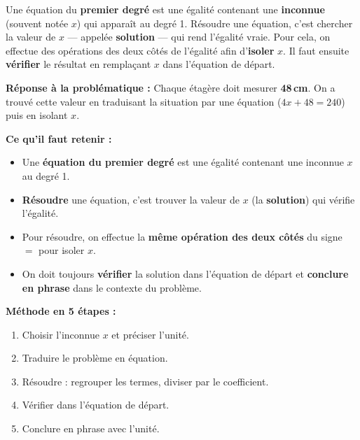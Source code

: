 \documentclass[a4paper,11pt]{article}
\begin{document}
\begin{correction}
\og Une équation du \textbf{premier degré} est une égalité contenant une \textbf{inconnue} (souvent notée $x$) qui apparaît au degré 1. Résoudre une équation, c'est chercher la valeur de $x$ — appelée \textbf{solution} — qui rend l'égalité vraie. Pour cela, on effectue des opérations des deux côtés de l'égalité afin d'\textbf{isoler} $x$. Il faut ensuite \textbf{vérifier} le résultat en remplaçant $x$ dans l'équation de départ. \fg
\end{correction}

\vspace{10pt}

\begin{retenir}
\textbf{Réponse à la problématique :} Chaque étagère doit mesurer \textbf{48\,cm}. On a trouvé cette valeur en traduisant la situation par une équation ($4x + 48 = 240$) puis en isolant $x$.

\bigskip
\textbf{Ce qu'il faut retenir :}
\begin{itemize}[leftmargin=14pt]
  \item Une \textbf{équation du premier degré} est une égalité contenant une inconnue $x$ au degré 1.
  \item \textbf{Résoudre} une équation, c'est trouver la valeur de $x$ (la \textbf{solution}) qui vérifie l'égalité.
  \item Pour résoudre, on effectue la \textbf{même opération des deux côtés} du signe $=$ pour isoler $x$.
  \item On doit toujours \textbf{vérifier} la solution dans l'équation de départ et \textbf{conclure en phrase} dans le contexte du problème.
\end{itemize}

\bigskip
\textbf{Méthode en 5 étapes :}
\begin{enumerate}[leftmargin=18pt]
  \item Choisir l'inconnue $x$ et préciser l'unité.
  \item Traduire le problème en équation.
  \item Résoudre : regrouper les termes, diviser par le coefficient.
  \item Vérifier dans l'équation de départ.
  \item Conclure en phrase avec l'unité.
\end{enumerate}
\end{retenir}
\end{document}
